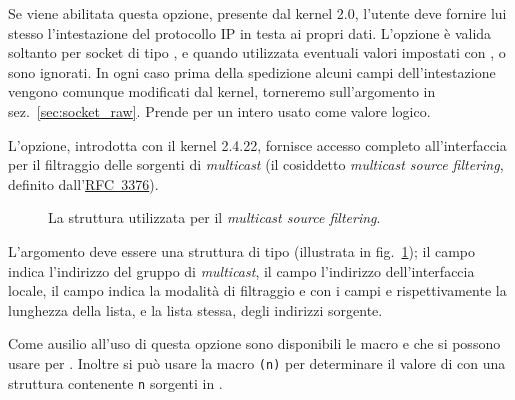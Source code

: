 \begin{basedescript}{\desclabelwidth{2.0cm}\desclabelstyle{\nextlinelabel}}
\item[\constd{IP\_HDRINCL}] Se viene abilitata questa opzione, presente dal
  kernel 2.0, l'utente deve fornire lui stesso l'intestazione del protocollo
  IP in testa ai propri dati. L'opzione è valida soltanto per socket di tipo
  , e quando utilizzata eventuali valori impostati con
  ,  o  sono ignorati. In
  ogni caso prima della spedizione alcuni campi dell'intestazione vengono
  comunque modificati dal kernel, torneremo sull'argomento in
  sez.~\ref{sec:socket_raw}.  Prende per  un intero usato come
  valore logico.

\item[\constd{IP\_MSFILTER}] L'opzione, introdotta con il kernel 2.4.22,
  fornisce accesso completo all'interfaccia per il filtraggio delle sorgenti
  di \textit{multicast} (il cosiddetto \textit{multicast source filtering},
  definito dall'\href{http://www.ietf.org/rfc/rfc3376.txt}{RFC~3376}).

\begin{figure}[!htb]
  \footnotesize \centering
  \begin{minipage}[c]{0.90\textwidth}
  \end{minipage}
  \caption{La struttura  utilizzata per il
    \textit{multicast source filtering}.}
  \label{fig:ip_msfilter_struct}
\end{figure}

L'argomento  deve essere una struttura di tipo
 (illustrata in fig.~\ref{fig:ip_msfilter_struct}); il
campo  indica l'indirizzo del gruppo di
\textit{multicast}, il campo  l'indirizzo
dell'interfaccia locale, il campo  indica la modalità di
filtraggio e con i campi  e 
rispettivamente la lunghezza della lista, e la lista stessa, degli indirizzi
sorgente.

Come ausilio all'uso di questa opzione sono disponibili le macro
 e  che si possono usare per
. Inoltre si può usare la macro
\texttt{(\textsf{n})} per determinare il valore
di  con una struttura  contenente
\texttt{\textsf{n}} sorgenti in .


\end{basedescript}
